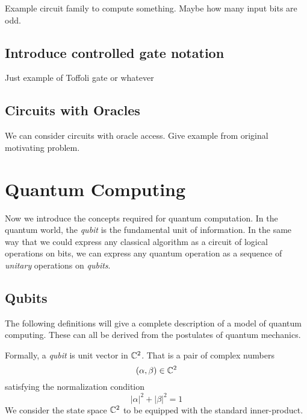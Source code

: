         \begin{example}
            Example circuit family to compute something. Maybe how many input bits are odd.  
            \begin{figure}[ht]
                \centering
                    \placeholderfig
                \caption{}
            \end{figure}
        \end{example}
        
        \subsection{Introduce controlled gate notation}
        
        Just example of Toffoli gate or whatever

        \subsection{Circuits with Oracles}

        We can consider circuits with oracle access.  Give example from original motivating problem.



\section{Quantum Computing}
        Now we introduce the concepts required for quantum computation. In the quantum world, the \emph{qubit} is 
        the fundamental unit of information. In the same way that we could express any classical algorithm as a 
        circuit of logical operations on bits, we can express any quantum operation as a sequence of \emph{unitary} 
        operations on \emph{qubits}.
       
   \subsection{Qubits}

        The following definitions will give a complete description of a model of quantum computing. These can all 
        be derived from the postulates of quantum mechanics.
       
      \begin{definition}
            Formally, a \emph{qubit} is unit vector in $\mathbb{C}^2$. That is a pair of complex numbers
            \[
                (\alpha, \beta) \in \mathbb{C}^2
            \]
            satisfying the normalization condition %
            \[
                |\alpha|^2 + |\beta|^2 = 1
            \]
            We consider the state space $\mathbb{C}^2$ to be equipped with the standard inner-product.
        \end{definition}
        
